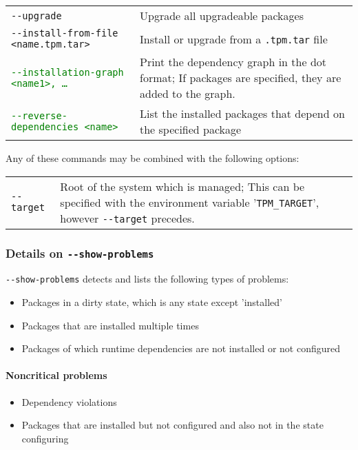 \documentclass[a4paper]{article}
\newcommand{\variable}[1]{'\texttt{#1}'}
\newcommand{\green}[1]{\textcolor{green}{#1}}
\begin{document}
\begin{tabularx}{\textwidth}{lX}
		\texttt{-{}-upgrade} & Upgrade all upgradeable packages \\
		
		\texttt{-{}-install-from-file <name.tpm.tar>} & Install or upgrade from a \texttt{.tpm.tar} file \\
		
		\green{\texttt{-{}-installation-graph <name1>, \dots}} & Print the dependency graph in the dot format; If packages are specified, they are added to the graph. \\
		
		\green{\texttt{-{}-reverse-dependencies <name>}} & List the installed packages that depend on the specified package \\
		
	\end{tabularx}
	\egroup

	\vspace{1em}
	Any of these commands may be combined with the following options: \\
	\bgroup
	\def\arraystretch{1.5}
	\begin{tabularx}{\textwidth}{lX}
		\texttt{-{}-target} & Root of the system which is managed; This can be specified with the environment variable \variable{TPM\_TARGET}, however \texttt{-{}-target} precedes. \\
	\end{tabularx}
	\egroup
	
	\subsubsection{Details on \texttt{-{}-show-problems}}
	
	\texttt{-{}-show-problems} detects and lists the following types of problems:
	
	\noindent
	\begin{itemize}
		\item Packages in a dirty state, which is any state except 'installed'
		\item Packages that are installed multiple times
		\item Packages of which runtime dependencies are not installed or not configured
	\end{itemize}

	\paragraph{Noncritical problems}
	\noindent
	\begin{itemize}
		\item Dependency violations
		\item Packages that are installed but not configured and also not in the state configuring
	\end{itemize}
	
\end{document}
